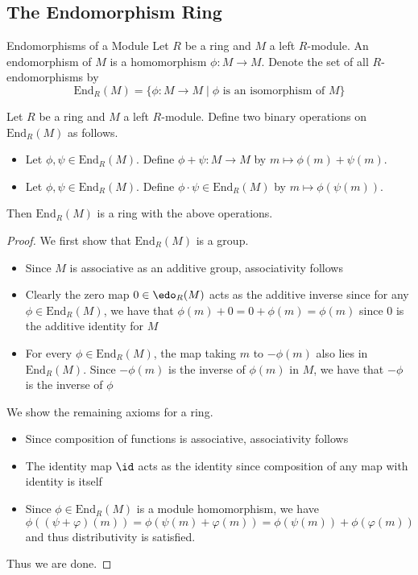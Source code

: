 \documentclass[a4paper]{article}
\begin{document}
\subsection{The Endomorphism Ring}
\begin{defn}{Endomorphisms of a Module}{} Let $R$ be a ring and $M$ a left $R$-module. An endomorphism of $M$ is a homomorphism $\phi:M\to M$. Denote the set of all $R$-endomorphisms by $$\text{End}_R(M)=\{\phi:M\to M\;|\;\phi\text{ is an isomorphism of }M\}$$
\end{defn}

\begin{prp}{}{} Let $R$ be a ring and $M$ a left $R$-module. Define two binary operations on $\text{End}_R(M)$ as follows. 
\begin{itemize}
\item Let $\phi,\psi\in\text{End}_R(M)$. Define $\phi+\psi:M\to M$ by $m\mapsto\phi(m)+\psi(m)$. 
\item Let $\phi,\psi\in\text{End}_R(M)$. Define $\phi\cdot\psi\in\text{End}_R(M)$ by $m\mapsto\phi(\psi(m))$. 
\end{itemize}
Then $\text{End}_R(M)$ is a ring with the above operations. \tcbline
\begin{proof}
We first show that $\text{End}_R(M)$ is a group. 
\begin{itemize}
\item Since $M$ is associative as an additive group, associativity follows
\item Clearly the zero map $0\in\edo_R(M)$ acts as the additive inverse since for any $\phi\in\text{End}_R(M)$, we have that $\phi(m)+0=0+\phi(m)=\phi(m)$ since $0$ is the additive identity for $M$
\item For every $\phi\in\text{End}_R(M)$, the map taking $m$ to $-\phi(m)$ also lies in $\text{End}_R(M)$. Since $-\phi(m)$ is the inverse of $\phi(m)$ in $M$, we have that $-\phi$ is the inverse of $\phi$
\end{itemize}
We show the remaining axioms for a ring. 
\begin{itemize}
\item Since composition of functions is associative, associativity follows
\item The identity map $\id$ acts as the identity since composition of any map with identity is itself
\item Since $\phi\in\text{End}_R(M)$ is a module homomorphism, we have $$\phi((\psi+\varphi)(m))=\phi(\psi(m)+\varphi(m))=\phi(\psi(m))+\phi(\varphi(m))$$ and thus distributivity is satisfied. 
\end{itemize}
Thus we are done. 
\end{proof}
\end{prp}
\end{document}

